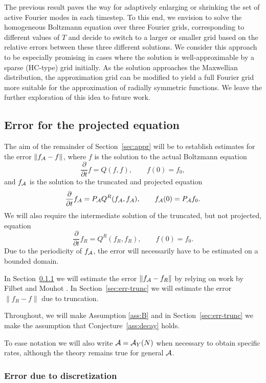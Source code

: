 \begin{remark}
    The previous result paves the way for adaptively enlarging or shrinking
    the set of active Fourier modes in each timestep.  To this end, we envision
    to solve the homogeneous Boltzmann equation over three Fourier grids,
    corresponding to different values of $T$ and decide to switch to a
    larger or smaller grid based on the relative errors between these three
    different solutions.  We consider this approach to be especially promising
    in cases where the solution is well-approximable by a sparse (HC-type) grid
    initially. As the solution approaches the Maxwellian distribution, the
    approximation grid can be modified to yield a full Fourier grid more
    suitable for the approximation of radially symmetric functions.  We leave
    the further exploration of this idea to future work.
\end{remark}

\subsection{Error for the projected equation} \label{sec:evolerr}

The aim of the remainder of Section~\ref{sec:appr} will be to establish
estimates for the error $\|f_{\mathcal{A}} - f\|$, where $f$ is the solution to the actual
Boltzmann equation
\[
    \frac{\partial}{\partial t}{f} = Q(f,f), \qquad f(0) = f_0,
\]
and $f_{\mathcal{A}}$ is the solution to the truncated and projected equation
\[
    \frac{\partial}{\partial t}{f}_{\mathcal{A}} = P_{\mathcal{A}} Q^R(f_{\mathcal{A}}, f_{\mathcal{A}}), \qquad f_{\mathcal{A}}(0) = P_{\mathcal{A}} f_0.
\]
We will also require the intermediate solution of the truncated, but not
projected, equation
\[
    \frac{\partial}{\partial t}{f}_R = Q^R(f_R, f_R), \qquad f(0) = f_0.
\]
Due to the periodicity of $f_{\mathcal{A}}$, the error will necessarily have to be
estimated on a bounded domain.

In Section~\ref{sec:extfilb} we will estimate the error $\|f_{\mathcal{A}}-f_R\|$ by relying
on work by Filbet and Mouhot \cite{Filbet11}. In Section~\ref{sec:err-trunc} we
will estimate the error $\|f_R-f\|$ due to truncation.

Throughout, we will make Assumption \ref{ass:B} and in Section~\ref{sec:err-trunc}
we make the assumption that Conjecture~\ref{ass:decay} holds.

To ease notation we will also write $\mathcal{A}=\mathcal{A}_Y(N)$ when necessary to obtain specific rates, although the
theory remains true for general $\mathcal{A}$.

\subsubsection{Error due to discretization} \label{sec:extfilb}

